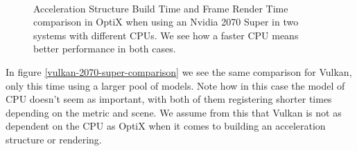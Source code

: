 \begin{figure}
    \\
    \caption{Acceleration Structure Build Time and Frame Render Time comparison in OptiX when using an Nvidia 2070 Super in two systems with different CPUs. We see how a faster CPU means better performance in both cases.}
    \label{optix-2070-super-comparison}
\end{figure}

In figure \ref{vulkan-2070-super-comparison} we see the same comparison for Vulkan, only this time using a larger pool of models. Note how in this case the model of CPU doesn't seem as important, with both of them registering shorter times depending on the metric and scene. We assume from this that Vulkan is not as dependent on the CPU as OptiX when it comes to building an acceleration structure or rendering.


